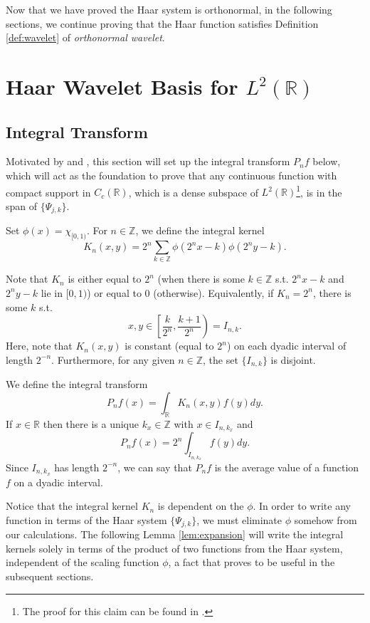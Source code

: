 \documentclass[11pt]{amsart}
\theoremstyle{theorem} %
\theoremstyle{definition}
\theoremstyle{example}
\theoremstyle{remark}
\numberwithin{equation}{section}
\newcommand{\R}{\mathbb{R}}
\newcommand{\Z}{\mathbb{Z}}
\begin{document}
Now that we have proved the Haar system is orthonormal, in the following sections, we continue proving that the Haar function satisfies Definition \ref{def:wavelet} of \emph{orthonormal wavelet}.

\section{Haar Wavelet Basis for $ L^2(\R) $} \label{section:span}
\subsection{Integral Transform}
Motivated by \cite[3]{bell} and \cite[516]{davidson}, this section will set up the integral transform $ P_nf $ below, which will act as the foundation to prove that any continuous function with compact support in $ C_c(\R) $, which is a dense subspace of $ L^2(\R) $\footnote{The proof for this claim can be found in \cite[326]{farrell}.}, is in the span of $ \{ \varPsi_{j,k} \} $.

\vspace{8pt}
Set $ \phi(x) = \chi_{[0,1)}$. For $ n \in \Z $, we define the integral kernel
\[ K_n (x,y) = 2^n \sum_{k \in \Z} \phi(2^n x - k) \phi(2^n y - k). \]

Note that $ K_n $ is either equal to $ 2^n $ (when there is some $ k \in \Z $ s.t. $ 2^n x-k $ and $ 2^ny - k $ lie in $ [0,1) $) or equal to 0 (otherwise). Equivalently, if $ K_n = 2^n $, there is some $ k $ s.t.
\[ x,y \in \left[ \frac{k}{2^n}, \frac{k+1}{2^n} \right) = I_{n,k}. \]
Here, note that $ K_n(x,y) $ is constant (equal to $ 2^n $) on each dyadic interval of length $ 2^{-n} $. Furthermore, for any given $ n \in \Z $, the set $ \{ I_{n,k} \} $ is disjoint.

We define the integral transform
\[ P_n f(x) = \int_{\R} K_n(x,y) f(y) dy. \]
If $ x \in \R $ then there is a unique $ k_x \in \Z $ with $ x \in I_{n, k_x} $ and
\begin{equation} \label{eq:pnf}
	P_n f(x) = 2^n \int_{I_{n,k_x}} f(y) dy.
\end{equation}
Since $ I_{n,k_x} $ has length $ 2^{-n} $, we can say that $ P_nf $ is the average value of a function $ f $ on a dyadic interval.

\vspace{8pt}
Notice that the integral kernel $ K_n $ is dependent on the $ \phi $. In order to write any function in terms of the Haar system $ \{ \varPsi_{j,k} \} $, we must eliminate $ \phi $ somehow from our calculations. The following Lemma \ref{lem:expansion} will write the integral kernels solely in terms of the product of two functions from the Haar system, independent of the scaling function $ \phi $, a fact that proves to be useful in the subsequent sections.
\end{document}
